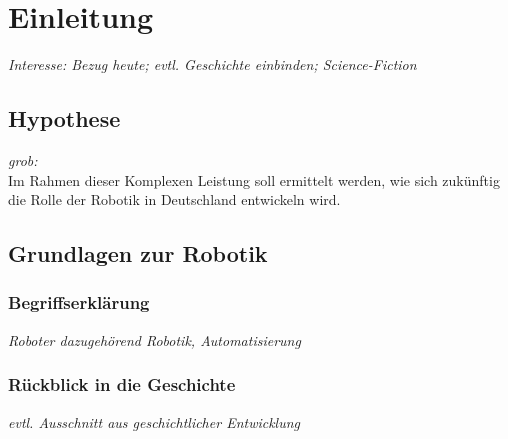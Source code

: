 \chapter{Einleitung}
\emph{Interesse: Bezug heute; evtl. Geschichte einbinden; Science-Fiction}

\section{Hypothese}
\emph{grob:} \\
Im Rahmen dieser Komplexen Leistung soll ermittelt werden, wie sich zukünftig die Rolle der Robotik in Deutschland entwickeln wird.

\section{Grundlagen zur Robotik}

\subsection{Begriffserklärung}
\textit{Roboter dazugehörend Robotik, Automatisierung}

\subsection{Rückblick in die Geschichte}
\textit{evtl. Ausschnitt aus geschichtlicher Entwicklung}
